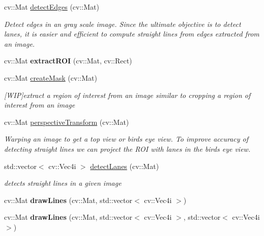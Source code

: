 \begin{DoxyCompactItemize}
cv\+::\+Mat \hyperlink{classlanedetector_a8830dfaa616e20b5e15f8846fa8660eb}{detect\+Edges} (cv\+::\+Mat)
\begin{DoxyCompactList}\small\item\em Detect edges in an gray scale image. Since the ultimate objective is to detect lanes, it is easier and efficient to compute straight lines from edges extracted from an image. \end{DoxyCompactList}\item 
cv\+::\+Mat {\bfseries extract\+R\+OI} (cv\+::\+Mat, cv\+::\+Rect)\hypertarget{classlanedetector_ab82eab5e0a1d126018c99875b2486d5e}{}\label{classlanedetector_ab82eab5e0a1d126018c99875b2486d5e}

\item 
cv\+::\+Mat \hyperlink{classlanedetector_abea27c43dbcf8444f5c2b23dd6e4bb6d}{create\+Mask} (cv\+::\+Mat)
\begin{DoxyCompactList}\small\item\em \mbox{[}W\+IP\mbox{]}extract a region of interest from an image similar to cropping a region of interest from an image \end{DoxyCompactList}\item 
cv\+::\+Mat \hyperlink{classlanedetector_a6433369cb584d5c247fe1a00569d17d5}{perspective\+Transform} (cv\+::\+Mat)
\begin{DoxyCompactList}\small\item\em Warping an image to get a top view or bird\textquotesingle{}s eye view. To improve accuracy of detecting straight lines we can project the R\+OI with lanes in the bird\textquotesingle{}s eye view. \end{DoxyCompactList}\item 
std\+::vector$<$ cv\+::\+Vec4i $>$ \hyperlink{classlanedetector_a10d588d6b85384ad237e6fbfdf679591}{detect\+Lanes} (cv\+::\+Mat)
\begin{DoxyCompactList}\small\item\em detects straight lines in a given image \end{DoxyCompactList}\item 
cv\+::\+Mat {\bfseries draw\+Lines} (cv\+::\+Mat, std\+::vector$<$ cv\+::\+Vec4i $>$)\hypertarget{classlanedetector_a7d7506555f481f184276a4180c200a73}{}\label{classlanedetector_a7d7506555f481f184276a4180c200a73}

\item 
cv\+::\+Mat {\bfseries draw\+Lines} (cv\+::\+Mat, std\+::vector$<$ cv\+::\+Vec4i $>$, std\+::vector$<$ cv\+::\+Vec4i $>$)\hypertarget{classlanedetector_a714784d2ef657578c3b8bbef5aeb3dd4}{}\label{classlanedetector_a714784d2ef657578c3b8bbef5aeb3dd4}


\end{DoxyCompactItemize}
